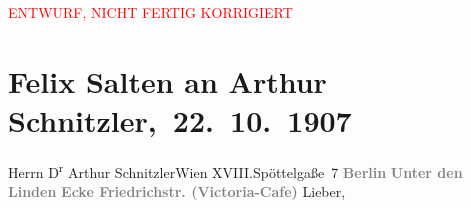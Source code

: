 
\begin{center}
            \textcolor{red}{ENTWURF, NICHT FERTIG KORRIGIERT}
                      \end{center}
            
         
         \renewcommand{\erwaehntePersonen}{Personen: Felix Salten, Ottilie Salten}
         \renewcommand{\erwaehnteInstitutionen}{Institutionen: Lessing-Theater}
         \renewcommand{\erwaehnteOrte}{Orte: Berlin, Charlottenburg, Edmund-Weiß-Gasse 7, Friedrichstraße, Hotel Victoria und Victoria-Café, Unter den Linden, Wien, XVIII., Währing}
         \renewcommand{\erwaehnteWerke}{Werke: Vom andern Ufer. Einakter}
               \section[ Felix Salten an Arthur Schnitzler, 22. 10. 1907]{ Felix Salten an Arthur Schnitzler, 22. 10. 1907}\nopagebreak{}\rehead{ }\begin{ledgroupsized}[t]{13cm}\normalsize\beginnumbering \toendnotes[C]{\smallbreak\pagebreak[2]} 
\toendnotes[C]{\smallbreak}\pstart{}{\pb}Herrn D\textsuperscript{r} Arthur Schnitzler\pend{}\pstart{}Wien XVIII.\pend{}\pstart{}Spöttelgaße 7\pend{}{\bigskip}\pstart
           \noindent{}\centering{}{\pb}\textcolor{gray}{\textbf{Berlin}}\pend
           \pstart
           \noindent{}\centering{}\textcolor{gray}{\textbf{Unter den Linden}}\pend
           \pstart
           \noindent{}\centering{}\textcolor{gray}{\textbf{Ecke Friedrichstr. (Victoria-Cafe)}}\pend
           \pstart{}{\pb}Lieber,\pend\pstart

\end{ledgroupsized}
